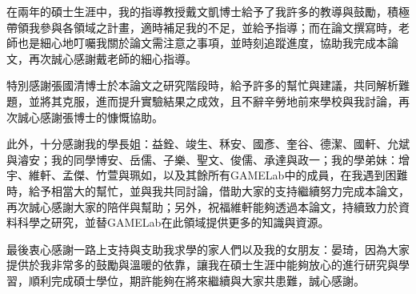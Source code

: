 在兩年的碩士生涯中，我的指導教授戴文凱博士給予了我許多的教導與鼓勵，積極帶領我參與各領域之計畫，適時補足我的不足，並給予指導；而在論文撰寫時，老師也是細心地叮囑我關於論文需注意之事項，並時刻追蹤進度，協助我完成本論文，再次誠心感謝戴老師的細心指導。

特別感謝張國清博士於本論文之研究階段時，給予許多的幫忙與建議，共同解析難題，並將其克服，進而提升實驗結果之成效，且不辭辛勞地前來學校與我討論，再次誠心感謝張博士的慷慨協助。

此外，十分感謝我的學長姐：益銓、竣生、秝安、國彥、奎谷、德潔、國軒、允斌與濬安；我的同學博安、岳儒、子樂、聖文、俊儒、承達與政一；我的學弟妹：增宇、維軒、孟傑、竹萱與珮如，以及其餘所有GAMELab中的成員，在我遇到困難時，給予相當大的幫忙，並與我共同討論，借助大家的支持繼續努力完成本論文，再次誠心感謝大家的陪伴與幫助；另外，祝福維軒能夠透過本論文，持續致力於資料科學之研究，並替GAMELab在此領域提供更多的知識與資源。

最後衷心感謝一路上支持與支助我求學的家人們以及我的女朋友：晏琦，因為大家提供於我非常多的鼓勵與溫暖的依靠，讓我在碩士生涯中能夠放心的進行研究與學習，順利完成碩士學位，期許能夠在將來繼續與大家共患難，誠心感謝。